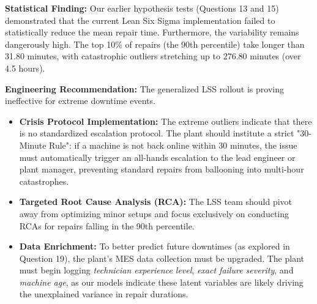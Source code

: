 \textbf{Statistical Finding:}
Our earlier hypothesis tests (Questions 13 and 15) demonstrated that the current Lean Six Sigma implementation failed to statistically reduce the mean repair time. Furthermore, the variability remains dangerously high. The top 10\% of repairs (the 90th percentile) take longer than 31.80 minutes, with catastrophic outliers stretching up to 276.80 minutes (over 4.5 hours). 

\textbf{Engineering Recommendation:}
The generalized LSS rollout is proving ineffective for extreme downtime events.
\begin{itemize}
    \item \textbf{Crisis Protocol Implementation:} The extreme outliers indicate that there is no standardized escalation protocol. The plant should institute a strict "30-Minute Rule": if a machine is not back online within 30 minutes, the issue must automatically trigger an all-hands escalation to the lead engineer or plant manager, preventing standard repairs from ballooning into multi-hour catastrophes.
    \item \textbf{Targeted Root Cause Analysis (RCA):} The LSS team should pivot away from optimizing minor setups and focus exclusively on conducting RCAs for repairs falling in the 90th percentile. 
    \item \textbf{Data Enrichment:} To better predict future downtimes (as explored in Question 19), the plant's MES data collection must be upgraded. The plant must begin logging \textit{technician experience level}, \textit{exact failure severity}, and \textit{machine age}, as our models indicate these latent variables are likely driving the unexplained variance in repair durations.
\end{itemize}
